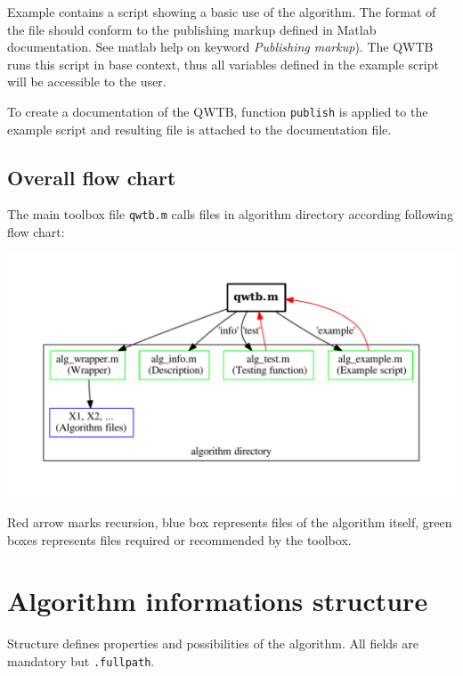 \documentclass[12pt,a4paper,oneside]{report} %
\begin{document}
Example contains a script showing a basic use of the algorithm. The format of the file should
conform to the publishing markup defined in Matlab documentation. See matlab help on keyword
\emph{Publishing markup}). The QWTB runs this script in base context, thus all variables defined in
the example script will be accessible to the user.

To create a documentation of the QWTB, function \lstinline{publish} is applied to the example script
and resulting file is attached to the documentation file.

\subsection{Overall flow chart} %
The main toolbox file {\tt qwtb.m} calls files in algorithm directory according following flow
chart:
\begin{center}
        \includegraphics[width=1.0\textwidth]{sources/outer_dependencies.pdf}
\end{center}
Red arrow marks recursion, blue box represents files of the algorithm itself, green boxes represents
files required or recommended by the toolbox.

\section{Algorithm informations structure} %
\label{structalginfo}
Structure defines properties and possibilities of the algorithm. All fields are mandatory but
\lstinline{.fullpath}.
\end{document}
